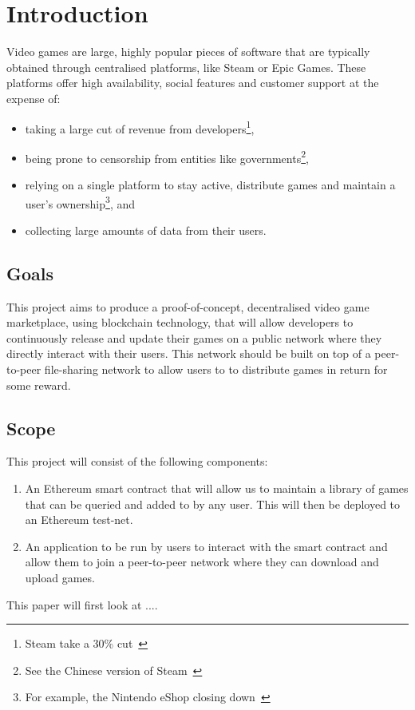 
\chapter{Introduction}\label{sec:problem}

Video games are large, highly popular pieces of software that are typically obtained through centralised platforms, like Steam or Epic Games. These platforms offer high availability, social features and customer support at the expense of:

\begin{itemize}
  \item taking a large cut of revenue from developers\footnote{Steam take a 30\% cut~\cite{marks_report_2019,brown_valve_2021}},
  \item being prone to censorship from entities like governments\footnote{See the Chinese version of Steam~\cite{noauthor_steam_nodate-1}},
  \item relying on a single platform to stay active, distribute games and maintain a user's ownership\footnote{For example, the Nintendo eShop closing down~\cite{noauthor_nintendo_2022}}, and
  \item collecting large amounts of data from their users.
\end{itemize}

\section{Goals}

This project aims to produce a proof-of-concept, decentralised video game marketplace, using blockchain technology, that will allow developers to continuously release and update their games on a public network where they directly interact with their users. This network should be built on top of a peer-to-peer file-sharing network to allow users to to distribute games in return for some reward.

\section{Scope}

This project will consist of the following components:

\begin{enumerate}
  \item An Ethereum smart contract that will allow us to maintain a library of games that can be queried and added to by any user. This will then be deployed to an Ethereum test-net.
  \item An application to be run by users to interact with the smart contract and allow them to join a peer-to-peer network where they can download and upload games.
\end{enumerate}

\newparagraph
This paper will first look at ....